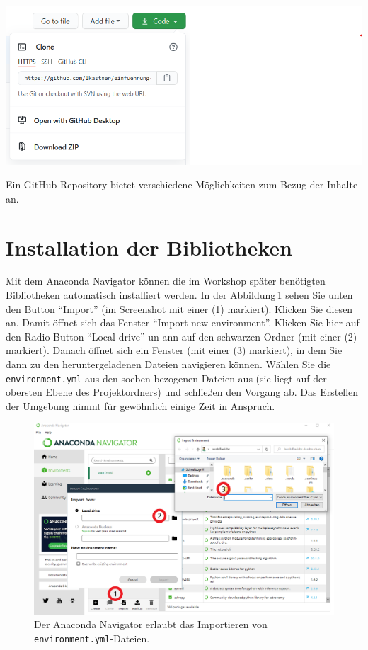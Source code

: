 \documentclass{tufte-handout}
\begin{document}
\begin{marginfigure}
  \includegraphics{github-zip}
  \caption{Ein GitHub-Repository bietet verschiedene Möglichkeiten zum Bezug der Inhalte an.}%
\label{fig:github}
\end{marginfigure}


\section{Installation der Bibliotheken}

Mit dem Anaconda Navigator können die im Workshop später benötigten Bibliotheken automatisch installiert werden.
In der Abbildung\,\ref{fig:anaconda-navigator} sehen Sie unten den Button \enquote{Import} (im Screenshot mit einer (1) markiert).
Klicken Sie diesen an.
Damit öffnet sich das Fenster \enquote{Import new environment}.
Klicken Sie hier auf den Radio Button \enquote{Local drive}
un ann auf den schwarzen Ordner (mit einer (2) markiert).
Danach öffnet sich ein Fenster (mit einer (3) markiert), in dem Sie dann zu den heruntergeladenen Dateien navigieren können.
Wählen Sie die \texttt{environment.yml} aus den soeben bezogenen Dateien aus (sie liegt auf der obersten Ebene des Projektordners) und schließen den Vorgang ab.
Das Erstellen der Umgebung nimmt für gewöhnlich einige Zeit in Anspruch.

\begin{figure}[h]
  \includegraphics{anaconda-navigator-import-new-environment--mit-reihenfolge}
  \caption{Der Anaconda Navigator erlaubt das Importieren von \texttt{environment.yml}-Dateien.}%
\label{fig:anaconda-navigator}
\end{figure}
\end{document}
